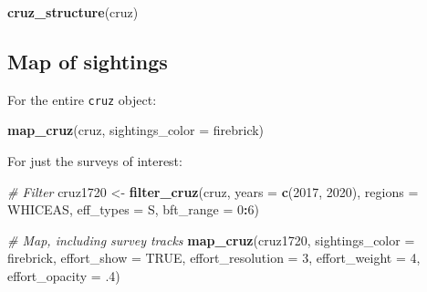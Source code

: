 \documentclass[
]{book}
\newenvironment{Shaded}{\begin{snugshade}}{\end{snugshade}}
\newcommand{\AttributeTok}[1]{\textcolor[rgb]{0.13,0.29,0.53}{#1}}
\newcommand{\CommentTok}[1]{\textcolor[rgb]{0.56,0.35,0.01}{\textit{#1}}}
\newcommand{\ConstantTok}[1]{\textcolor[rgb]{0.56,0.35,0.01}{#1}}
\newcommand{\DecValTok}[1]{\textcolor[rgb]{0.00,0.00,0.81}{#1}}
\newcommand{\FunctionTok}[1]{\textcolor[rgb]{0.13,0.29,0.53}{\textbf{#1}}}
\newcommand{\NormalTok}[1]{#1}
\newcommand{\OtherTok}[1]{\textcolor[rgb]{0.56,0.35,0.01}{#1}}
\newcommand{\SpecialCharTok}[1]{\textcolor[rgb]{0.81,0.36,0.00}{\textbf{#1}}}
\newcommand{\StringTok}[1]{\textcolor[rgb]{0.31,0.60,0.02}{#1}}
\begin{document}
\begin{Shaded}
\begin{Highlighting}[]
\FunctionTok{cruz\_structure}\NormalTok{(cruz)}
\end{Highlighting}
\end{Shaded}

\hypertarget{map-of-sightings}{%
\subsection*{Map of sightings}\label{map-of-sightings}}

For the entire \texttt{cruz} object:

\begin{Shaded}
\begin{Highlighting}[]
\FunctionTok{map\_cruz}\NormalTok{(cruz, }\AttributeTok{sightings\_color =} \StringTok{\textquotesingle{}firebrick\textquotesingle{}}\NormalTok{)}
\end{Highlighting}
\end{Shaded}

For just the surveys of interest:

\begin{Shaded}
\begin{Highlighting}[]
\CommentTok{\# Filter}
\NormalTok{cruz1720 }\OtherTok{\textless{}{-}} \FunctionTok{filter\_cruz}\NormalTok{(cruz, }
                        \AttributeTok{years =} \FunctionTok{c}\NormalTok{(}\DecValTok{2017}\NormalTok{, }\DecValTok{2020}\NormalTok{), }
                        \AttributeTok{regions =} \StringTok{\textquotesingle{}WHICEAS\textquotesingle{}}\NormalTok{,}
                        \AttributeTok{eff\_types =} \StringTok{\textquotesingle{}S\textquotesingle{}}\NormalTok{,}
                        \AttributeTok{bft\_range =} \DecValTok{0}\SpecialCharTok{:}\DecValTok{6}\NormalTok{)}

\CommentTok{\# Map, including survey tracks}
\FunctionTok{map\_cruz}\NormalTok{(cruz1720,}
         \AttributeTok{sightings\_color =} \StringTok{\textquotesingle{}firebrick\textquotesingle{}}\NormalTok{, }
         \AttributeTok{effort\_show =} \ConstantTok{TRUE}\NormalTok{, }
         \AttributeTok{effort\_resolution =} \DecValTok{3}\NormalTok{,}
         \AttributeTok{effort\_weight =} \DecValTok{4}\NormalTok{,}
         \AttributeTok{effort\_opacity =}\NormalTok{ .}\DecValTok{4}\NormalTok{)}
\end{Highlighting}
\end{Shaded}
\end{document}
